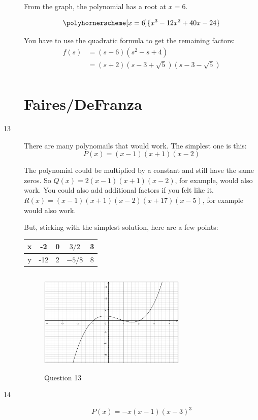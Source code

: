 \documentclass[fleqn,addpoints]{exam}
\begin{document}
\begin{description}
From the graph, the polynomial has a root at $x=6$.

\[
  \polyhornerscheme[x=6]{x^3-12x^2+40x-24} \\
\]

You have to use the quadratic formula to get the remaining factors:
\begin{align*}
  f(s) &= (s-6)(s^2 - s + 4) \\
   &= (s+2)(s - 3 + \sqrt{5})(s - 3 - \sqrt{5}) \\
\end{align*}

\pagebreak

\section{Faires/DeFranza}

\item[13]

There are many polynomails that would work.  The simplest one is this:
\[
  P(x) = (x-1)(x+1)(x-2)
\]

The polynomial could be multiplied by a constant and still have the same zeros.  So $Q(x) = 2(x-1)(x+1)(x-2)$, for
example, would also work.  You could also add additional factors if you felt like it.  $R(x) = (x-1)(x+1)(x-2)(x+17)(x-5)$, for example
would also work. 

But, sticking with the simplest solution, here are a few points:
\begin{tabular}{|c|c|c|c|c|}
\hline
  x & -2  & 0 & $3/2$  & 3 \\
\hline
  y & -12 & 2 & $-5/8$ & 8 \\
\hline
\end{tabular}

\begin{figure}[H]
  \centering
  \includegraphics[width=7cm,height=5cm]{question_13.eps}
  \caption*{Question 13}
\end{figure}

\item[14]
\[
  P(x) = -x(x-1)(x-3)^3
\]


\end{description}
\end{document}
